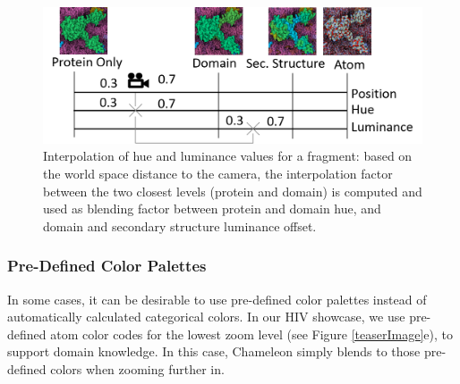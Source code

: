 \documentclass{egpubl}
\begin{document}
		\begin{figure}
			\centering
			\includegraphics[width=1\linewidth]{Figures/zoomfigure}
			\caption{Interpolation of hue and luminance values for a fragment: based on the world space distance to the camera, the interpolation factor between the two closest levels (protein and domain) is computed and used as blending factor between protein and domain hue, and domain and secondary structure luminance offset. 
				}
			\label{fig:zoom_continuum}
		\end{figure}
	
	
	\subsubsection{Pre-Defined Color Palettes}
	
	In some cases, it can be desirable to use pre-defined color palettes instead of automatically calculated categorical colors. 
	In our HIV showcase, we use pre-defined atom color codes for the lowest zoom level (see Figure \ref{teaserImage}e), to support domain knowledge. 
	In this case, Chameleon simply blends to those pre-defined colors when zooming further in. 
	
\end{document}
